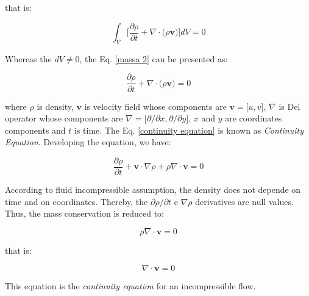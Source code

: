 \medskip
\noindent
that is:

\begin{equation} \label{massa 2}
 \int_{V} \Bigg[ \frac{\partial \rho}{\partial t}
 + 
 \nabla \cdot \big( \rho \textbf{v} \big) \Bigg] dV
 = 0 
\end{equation}

\medskip
\noindent 
Whereas the $dV \neq 0$,
the Eq. \ref{massa 2} can be presented as:

\begin{equation} \label{continuity equation}
 \frac{\partial \rho}{\partial t}
 + 
 \nabla \cdot \big( \rho \textbf{v} \big)
 = 0 
\end{equation}

\medskip
\noindent 
where $\rho$ is density, $\textbf{v}$ is velocity field
 whose components are $\textbf{v} = \big[u,v\big]$,
$\nabla$ is Del operator whose components are 
$\nabla = \big[ \partial/\partial x, \partial / \partial y \big]$,
$x$ and $y$ are coordinates components and
$t$ is time.
The Eq. \ref{continuity equation} is known
as \textit{Continuity Equation}.
Developing the equation, we have:

\begin{equation}
 \frac{\partial \rho}{\partial t}
 +
 \textbf{v} \cdot \nabla \rho
 +
 \rho \nabla \cdot \textbf{v}
 = 0
\end{equation}

\medskip
According to fluid incompressible assumption,
the density does not depende on time and on coordinates.
Thereby, the 
$\partial \rho / \partial t$ e $\nabla \rho$ derivatives are 
null values.
Thus, the mass conservation is reduced to:

\begin{equation} \label{massa 3}
 \rho \nabla \cdot \textbf{v}
 = 0 
\end{equation}

\medskip
\noindent that is:

\begin{equation} \label{incompressible continuity equation}
 \nabla \cdot \textbf{v}
 = 0 
\end{equation}

\medskip
\noindent This equation is the \textit{continuity equation} for an incompressible flow.


\newpage




